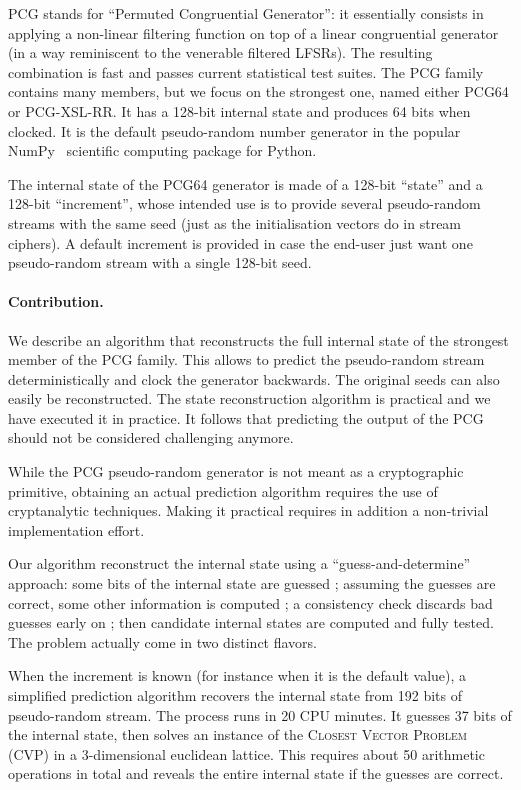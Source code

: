 \documentclass[submission,svgnames,journal=tosc]{iacrtrans}
\begin{document}
\textsf{PCG} stands for ``Permuted Congruential Generator'': it essentially
consists in applying a non-linear filtering function on top of a linear
congruential generator (in a way reminiscent to the venerable filtered
LFSRs). The resulting combination is fast and passes current statistical test
suites. The \textsf{PCG} family contains many members, but we focus on the
strongest one, named either \textsf{PCG64} or \textsf{PCG-XSL-RR}. It has a
128-bit internal state and produces 64 bits when clocked. It is the default
pseudo-random number generator in the popular \textsf{NumPy}~\cite{Numpy}
scientific computing package for \textsf{Python}.

The internal state of the \textsf{PCG64} generator is made of a 128-bit
``state'' and a 128-bit ``increment'', whose intended use is to provide several
pseudo-random streams with the same seed (just as the initialisation vectors do
in stream ciphers). A default increment is provided in case the end-user just
want one pseudo-random stream with a single 128-bit seed.

\paragraph{Contribution.} We describe an algorithm that reconstructs the full
internal state of the strongest member of the \textsf{PCG} family. This allows
to predict the pseudo-random stream deterministically and clock the generator
backwards. The original seeds can also easily be reconstructed. The state
reconstruction algorithm is practical and we have executed it in practice. It
follows that predicting the output of the \textsf{PCG} should not be considered
challenging anymore.

While the \textsf{PCG} pseudo-random generator is not meant as a cryptographic
primitive, obtaining an actual prediction algorithm requires the use of
cryptanalytic techniques. Making it practical requires in addition a non-trivial
implementation effort.

Our algorithm reconstruct the internal state using a ``guess-and-determine''
approach: some bits of the internal state are guessed ; assuming the guesses are
correct, some other information is computed ; a consistency check discards bad
guesses early on ; then candidate internal states are computed and fully
tested. The problem actually come in two distinct flavors.

When the increment is known (for instance when it is the default value), a
simplified prediction algorithm recovers the internal state from 192 bits of
pseudo-random stream. The process runs in 20 CPU minutes. It guesses 37 bits of
the internal state, then solves an instance of the \textsc{Closest Vector
  Problem} (CVP) in a 3-dimensional euclidean lattice. This requires about 50
arithmetic operations in total and reveals the entire internal state if the
guesses are correct.
\end{document}
